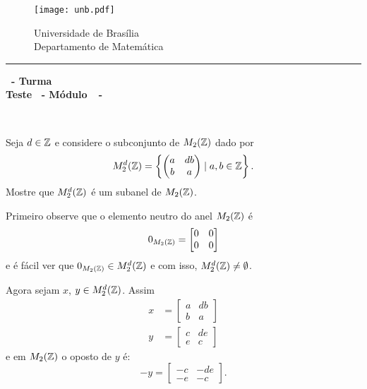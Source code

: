 \documentclass[12pt]{exam}
\begin{document}
    \begin{figure}[h]
        \begin{minipage}[c]{1.7cm}
            \texttt{[image: unb.pdf]}
        \end{minipage}
        \hspace{0pt}
        \begin{minipage}[c]{4in}
            {Universidade de Brasília} \\
            {Departamento de Matemática}
        \end{minipage}
    \end{figure}
    \hrule
    \begin{center}
        {\Large\bf \disciplina\ - Turma \turma}  \\
         {\large\bf Teste \numeroteste\ - Módulo\ \modulo\ -\ \dataavaliacao}
    \end{center}

    \\
    \vspace*{.01cm}


    \vspace{.4cm}


    \questao Seja $d \in \mathbb{Z}$ e considere o subconjunto de $M_2(\mathbb{Z})$ dado por
    \[
    M_2^d(\mathbb{Z}) = \left\{\begin{pmatrix} a & db \\ b & a \end{pmatrix} \mid a, b \in \mathbb{Z}\right\}.
    \]
    Mostre que $M_2^d(\mathbb{Z})$ é um subanel de $M_2(\mathbb{Z})$.

    \solucao \noindent Primeiro observe que o elemento neutro do anel $M_2(\mathbb{Z})$ é
    \[
        0_{M_2(\mathbb{Z})} = \begin{bmatrix}
            0 & 0\\
            0 & 0
        \end{bmatrix}
    \]
    e é fácil ver que $0_{M_2(\mathbb{Z})} \in M_2^d(\mathbb{Z})$ e com isso, $M_2^d(\mathbb{Z}) \ne \emptyset$.

    Agora sejam $x$, $y \in M_2^d(\mathbb{Z})$. Assim
    \begin{align*}
        x &= \begin{bmatrix}
            a & db\\b & a
        \end{bmatrix}\\
        y &= \begin{bmatrix}
            c & de\\e & c
        \end{bmatrix}
    \end{align*}
    e em $M_2(\mathbb{Z})$ o oposto de $y$ é:
    \[
        -y = \begin{bmatrix}
            -c & -de\\-e & -c
        \end{bmatrix}.
    \]
\end{document}
